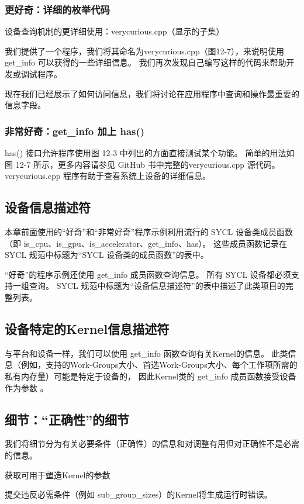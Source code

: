 \subsubsection{更好奇：详细的枚举代码}
{\color{red} 设备查询机制的更详细使用：verycurious.cpp（显示的子集）}

我们提供了一个程序，我们将其命名为verycurious.cpp（图12-7），来说明使用get\_info 可以获得的一些详细信息。 
我们再次发现自己编写这样的代码来帮助开发或调试程序。

现在我们已经展示了如何访问信息，我们将讨论在应用程序中查询和操作最重要的信息字段。

\subsubsection{非常好奇：get\_info 加上 has()}
has() 接口允许程序使用图 12-3 中列出的方面直接测试某个功能。 
简单的用法如图 12-7 所示，更多内容请参见 GitHub 书中完整的verycurious.cpp 源代码。
 verycurious.cpp 程序有助于查看系统上设备的详细信息。

\subsection{设备信息描述符}
本章前面使用的“好奇”和“非常好奇”程序示例利用流行的 SYCL 设备类成员函数
（即 is\_cpu、is\_gpu、is\_accelerator、get\_info、has）。 
这些成员函数记录在 SYCL 规范中标题为“SYCL 设备类的成员函数”的表中。

“好奇”的程序示例还使用 get\_info 成员函数查询信息。 所有 SYCL 设备都必须支持一组查询。 
SYCL 规范中标题为“设备信息描述符”的表中描述了此类项目的完整列表。

\subsection{设备特定的Kernel信息描述符}
与平台和设备一样，我们可以使用 get\_info 函数查询有关Kernel的信息。 
此类信息（例如，支持的Work-Groups大小、首选Work-Groups大小、每个工作项所需的私有内存量）可能是特定于设备的，
因此Kernel类的 get\_info 成员函数接受设备作为参数 。

\subsection{细节：“正确性”的细节}
我们将细节分为有关必要条件（正确性）的信息和对调整有用但对正确性不是必需的信息。

{\color{red} 获取可用于塑造Kernel的参数}

\begin{remark}
	提交违反必需条件（例如 sub\_group\_sizes）的Kernel将生成运行时错误。
\end{remark}

